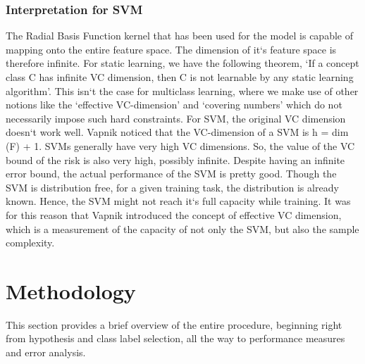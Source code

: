 \documentclass[letterpaper,12pt, onecolumn]{article}%
\begin{document}
\subsubsection*{Interpretation for SVM} 
The Radial Basis Function kernel that has been used for the model is capable of mapping onto the entire feature space. The dimension of it`s feature space is therefore infinite. For static learning, we have the following theorem, \enquote*{If a concept class C has infinite VC dimension, then C is not learnable by any static learning algorithm}. This isn`t the case for multiclass learning, where we make use of other notions like the \enquote*{effective VC-dimension} and \enquote*{covering numbers} which do not necessarily impose such hard constraints. For SVM, the original VC dimension doesn`t work well. Vapnik noticed that the VC-dimension of a SVM is 	h = dim (F) + 1.				
SVMs generally have very high VC dimensions. So, the value of the VC bound of the risk is also very high, possibly infinite. Despite having an infinite error bound, the actual performance of the SVM is pretty good. Though the SVM is distribution free, for a given training task, the distribution is already known. Hence, the SVM might not reach it`s full capacity while training. It was for this reason that Vapnik introduced the concept of effective VC dimension, which is a measurement of the capacity of not only the SVM, but also the sample complexity. 


\section{Methodology} \label{sec:methodology}
\noindent
This section provides a brief overview of the entire procedure, beginning right from hypothesis and class label selection, all the way to performance measures and error analysis. 
\end{document}
